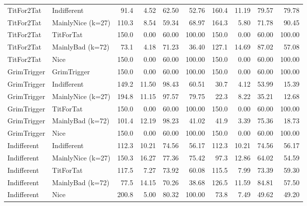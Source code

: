 \documentclass[journal,10pt,twoside]{IEEEtran}
\begin{document}
\begin{table}[ht]
\begin{tabular}{ll|rrrr|rrrr}
        TitFor2Tat        & Indifferent       &  91.4 &  4.52 &  62.50 &      52.76 & 160.4 & 11.19 &  79.57 &      79.78 \\
        TitFor2Tat        & MainlyNice (k=27) & 110.3 &  8.54 &  59.34 &      68.97 & 164.3 &  5.80 &  71.78 &      90.45 \\
        TitFor2Tat        & TitForTat         & 150.0 &  0.00 &  60.00 &     100.00 & 150.0 &  0.00 &  60.00 &     100.00 \\
        TitFor2Tat        & MainlyBad (k=72)  &  73.1 &  4.18 &  71.23 &      36.40 & 127.1 & 14.69 &  87.02 &      57.08 \\
        TitFor2Tat        & Nice              & 150.0 &  0.00 &  60.00 &     100.00 & 150.0 &  0.00 &  60.00 &     100.00 \\
        GrimTrigger       & GrimTrigger       & 150.0 &  0.00 &  60.00 &     100.00 & 150.0 &  0.00 &  60.00 &     100.00 \\
        GrimTrigger       & Indifferent       & 149.2 & 11.50 &  98.43 &      60.51 &  30.7 &  4.12 &  53.99 &      15.39 \\
        GrimTrigger       & MainlyNice (k=27) & 194.8 & 11.15 &  97.57 &      79.75 &  22.3 &  8.22 &  35.21 &      12.68 \\
        GrimTrigger       & TitForTat         & 150.0 &  0.00 &  60.00 &     100.00 & 150.0 &  0.00 &  60.00 &     100.00 \\
        GrimTrigger       & MainlyBad (k=72)  & 101.4 & 12.19 &  98.23 &      41.02 &  41.9 &  3.39 &  75.36 &      18.73 \\
        GrimTrigger       & Nice              & 150.0 &  0.00 &  60.00 &     100.00 & 150.0 &  0.00 &  60.00 &     100.00 \\
        Indifferent       & Indifferent       & 112.3 & 10.21 &  74.56 &      56.17 & 112.3 & 10.21 &  74.56 &      56.17 \\
        Indifferent       & MainlyNice (k=27) & 150.3 & 16.27 &  77.36 &      75.42 &  97.3 & 12.86 &  64.02 &      54.59 \\
        Indifferent       & TitForTat         & 117.5 &  7.27 &  73.92 &      60.08 & 115.5 &  7.99 &  73.39 &      59.30 \\
        Indifferent       & MainlyBad (k=72)  &  77.5 & 14.15 &  70.26 &      38.68 & 126.5 & 11.59 &  84.81 &      57.50 \\
        Indifferent       & Nice              & 200.8 &  5.00 &  80.32 &     100.00 &  73.8 &  7.49 &  49.62 &      49.20 \\

\end{tabular}
\end{table}
\end{document}
